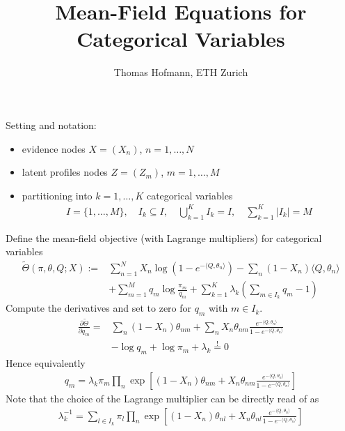 \documentclass{article}
\title{Mean-Field Equations for Categorical Variables}
\author{Thomas Hofmann, ETH Zurich}
\begin{document}
\noindent 
Setting and notation: 
\begin{itemize}
\item evidence nodes $X=(X_n)$, $n=1,\dots,N$
\item latent profiles nodes $Z=(Z_m)$, $m=1,\dots,M$
\item partitioning into $k=1,\dots,K$ categorical variables
\begin{align*}
I = \{1,\dots,M\} , \quad I_k \subseteq I, \quad \bigcup_{k=1}^K I_k = I, \quad \sum_{k=1}^K |I_k| = M
\end{align*}
\end{itemize}

\noindent
Define the mean-field objective (with Lagrange multipliers) for categorical variables
\begin{align}
\tilde\Theta(\pi, \theta, Q; X) :=  & 
\sum_{n=1}^N X_n \log \left(1- e^{- \langle Q, \theta_{n} \rangle} \right)  
- \! \sum_{n} (1-X_n) \langle Q,\theta_n \rangle \nonumber
\\ & 
+ \sum_{m=1}^M q_m \log \frac{\pi_m}{q_m}  
+ \sum_{k=1}^K  \lambda_k  \left( \sum_{m \in I_k}  q_m  - 1 \right)
\end{align}
Compute the derivatives and set to zero for $q_m$ with $m \in I_k$. 
\begin{align}
\frac{\partial \tilde\Theta}{\partial q_m} = &  
\sum_{n} (1-X_{n}) \theta_{nm} +  \sum_{n} X_n \theta_{nm} \frac{e^{-\langle Q, \theta_n \rangle}}{1 - e^{-\langle Q, \theta_n \rangle}} 
\nonumber \\
& - \log q_m + \log \pi_m + \lambda_k 
 \stackrel{!}{=}0 
\end{align}
Hence equivalently 
\begin{align}
q_m = \lambda_k \pi_m 
\prod_n \exp\left[(1-X_{n}) \theta_{nm} + X_n \theta_{nm} \frac{e^{-\langle Q, \theta_n \rangle}}{1 - e^{-\langle Q, \theta_n \rangle}}  \right]
\end{align}
Note that the choice of the Lagrange multiplier can be directly read of as 
\begin{align}
\lambda_k^{-1} = \sum_{l \in I_k} \pi_l
\prod_n \exp\left[(1-X_{n}) \theta_{nl} + X_n \theta_{nl} \frac{e^{-\langle Q, \theta_n \rangle}}{1 - e^{-\langle Q, \theta_n \rangle}}  \right]
\end{align}
\end{document}
